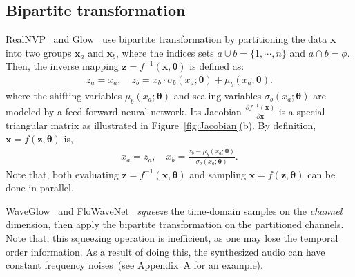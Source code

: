 \documentclass{article}
\newcommand{\vv}[1]{\boldsymbol{#1}}
\begin{document}
\vspace{-.2em}
\subsection{Bipartite transformation}
\vspace{-.1em}
RealNVP~\citep{dinh2016density} and Glow~\citep{kingma2018glow} use bipartite transformation by partitioning the data $\vv x$ into two groups $\vv x_a$ and $\vv x_b$, where the indices sets $a\cup b = \{1, \cdots, n \}$ and $a\cap b = \phi$. Then, the inverse mapping $\vv z = f^{-1}(\vv x, \vv\theta)$ is defined as:
\begin{align}
    z_a = x_a, \quad
    z_b = x_b \cdot \sigma_b(x_a; \vv\theta) + \mu_b(x_a; \vv\theta).
\end{align}
where the shifting variables $\mu_b(x_a; \vv\theta)$ and scaling variables $\sigma_b(x_a; \vv\theta)$ are modeled by a feed-forward neural network.
Its Jacobian $\frac{\partial f^{-1}(\vv x) }{\partial \vv x}$ is a special triangular matrix as illustrated in Figure~\ref{fig:Jacobian}(b).
By definition,  $\vv x = f(\vv z, \vv\theta)$ is,
\begin{align}
    x_a = z_a, \quad
    x_b = \frac{z_b - \mu_b(x_a; \vv\theta)}{\sigma_b( x_a; \vv\theta)}.
\end{align}
Note that, both evaluating $\vv z = f^{-1}(\vv x, \vv\theta)$ and sampling  $\vv x = f(\vv z, \vv\theta)$ can be done in parallel.


WaveGlow~\citep{prenger2019waveglow} and FloWaveNet~\citep{kim2018flowavenet} \emph{squeeze} the time-domain samples on the \emph{channel} dimension, then apply the bipartite transformation  on the partitioned channels. 
Note that, this squeezing operation is inefficient, as one may lose the temporal order information.
As a result of doing this, the synthesized audio can have constant frequency noises~(see Appendix~A for an example).

\vspace{-.2em}
\end{document}
